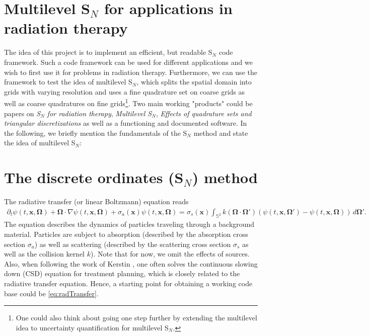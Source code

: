 \documentclass[10pt,a4paper]{article}
\begin{document}
\section*{Multilevel S$_N$ for applications in radiation therapy}
The idea of this project is to implement an efficient, but readable S$_N$ code framework. Such a code framework can be used for different applications and we wish to first use it for problems in radiation therapy. Furthermore, we can use the framework to test the idea of multilevel S$_N$, which splits the spatial domain into grids with varying resolution and uses a fine quadrature set on coarse grids as well as coarse quadratures on fine grids\footnote{One could also think about going one step further by extending the multilevel idea to uncertainty quantification for multilevel S$_N$.}. Two main working "products" could be papers on \textit{S$_N$ for radiation therapy}, \textit{Multilevel S$_N$}, \textit{Effects of quadrature sets and triangular discretizations} as well as a functioning and documented software. In the following, we briefly mention the fundamentals of the S$_N$ method and state the idea of multilevel S$_N$:

\section{The discrete ordinates (S$_N$) method}
The radiative transfer (or linear Boltzmann) equation reads
\begin{align}\label{eq:radTransfer}
\partial_t \psi(t,\bm x,\bm\Omega) + \bm\Omega\cdot\nabla \psi(t,\bm x,\bm\Omega) + \sigma_a(\bm x)\psi(t,\bm x,\bm\Omega) = \sigma_s(\bm x) \int_{\mathbb{S}^2} k(\bm\Omega\cdot\bm\Omega')\left(\psi(t,\bm x,\bm\Omega')-\psi(t,\bm x,\bm\Omega)\right)\,d\bm\Omega'.
\end{align}
The equation describes the dynamics of particles traveling through a background material. Particles are subject to absorption (described by the absorption cross section $\sigma_a$) as well as scattering (described by the scattering cross section $\sigma_s$ as well as the collision kernel $k$). Note that for now, we omit the effects of sources. Also, when following the work of Kerstin \cite{kupper2016models}, one often solves the continuous slowing down (CSD) equation for treatment planning, which is closely related to the radiative transfer equation. Hence, a starting point for obtaining a working code base could be \eqref{eq:radTransfer}.
\end{document}
